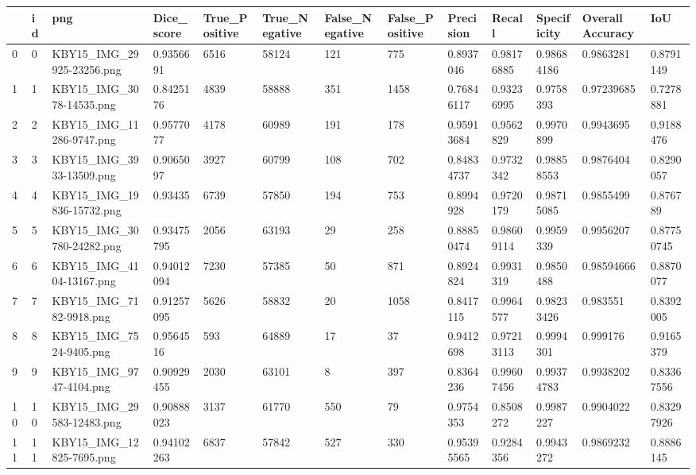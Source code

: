\documentclass[11pt, a4paper, twoside]{report}
\begin{document}
\begin{longtable}[c]{@{}lllllllllllll@{}}
\toprule
 & id & png & Dice\_score & True\_Positive & True\_Negative & False\_Negative & False\_Positive & Precision & Recall & Specificity & Overall Accuracy & IoU \\* \midrule
\endhead
%
\bottomrule
\endfoot
%
\endlastfoot
%
0 & 0 & KBY15\_IMG\_29925-23256.png & 0.9356691 & 6516 & 58124 & 121 & 775 & 0.8937046 & 0.98176885 & 0.98684186 & 0.9863281 & 0.8791149 \\
1 & 1 & KBY15\_IMG\_3078-14535.png & 0.8425176 & 4839 & 58888 & 351 & 1458 & 0.76846117 & 0.93236995 & 0.9758393 & 0.97239685 & 0.7278881 \\
2 & 2 & KBY15\_IMG\_11286-9747.png & 0.9577077 & 4178 & 60989 & 191 & 178 & 0.95913684 & 0.9562829 & 0.9970899 & 0.9943695 & 0.9188476 \\
3 & 3 & KBY15\_IMG\_3933-13509.png & 0.9065097 & 3927 & 60799 & 108 & 702 & 0.84834737 & 0.9732342 & 0.98858553 & 0.9876404 & 0.8290057 \\
4 & 4 & KBY15\_IMG\_19836-15732.png & 0.93435 & 6739 & 57850 & 194 & 753 & 0.8994928 & 0.9720179 & 0.98715085 & 0.9855499 & 0.876789 \\
5 & 5 & KBY15\_IMG\_30780-24282.png & 0.93475795 & 2056 & 63193 & 29 & 258 & 0.88850474 & 0.98609114 & 0.9959339 & 0.9956207 & 0.87750745 \\
6 & 6 & KBY15\_IMG\_4104-13167.png & 0.94012094 & 7230 & 57385 & 50 & 871 & 0.8924824 & 0.9931319 & 0.9850488 & 0.98594666 & 0.8870077 \\
7 & 7 & KBY15\_IMG\_7182-9918.png & 0.91257095 & 5626 & 58832 & 20 & 1058 & 0.8417115 & 0.9964577 & 0.98233426 & 0.983551 & 0.8392005 \\
8 & 8 & KBY15\_IMG\_7524-9405.png & 0.9564516 & 593 & 64889 & 17 & 37 & 0.9412698 & 0.97213113 & 0.9994301 & 0.999176 & 0.9165379 \\
9 & 9 & KBY15\_IMG\_9747-4104.png & 0.90929455 & 2030 & 63101 & 8 & 397 & 0.8364236 & 0.99607456 & 0.99374783 & 0.9938202 & 0.83367556 \\
10 & 10 & KBY15\_IMG\_29583-12483.png & 0.90888023 & 3137 & 61770 & 550 & 79 & 0.9754353 & 0.8508272 & 0.9987227 & 0.9904022 & 0.83297926 \\
11 & 11 & KBY15\_IMG\_12825-7695.png & 0.94102263 & 6837 & 57842 & 527 & 330 & 0.95395565 & 0.9284356 & 0.9943272 & 0.9869232 & 0.8886145 \\

\end{longtable}
\end{document}
